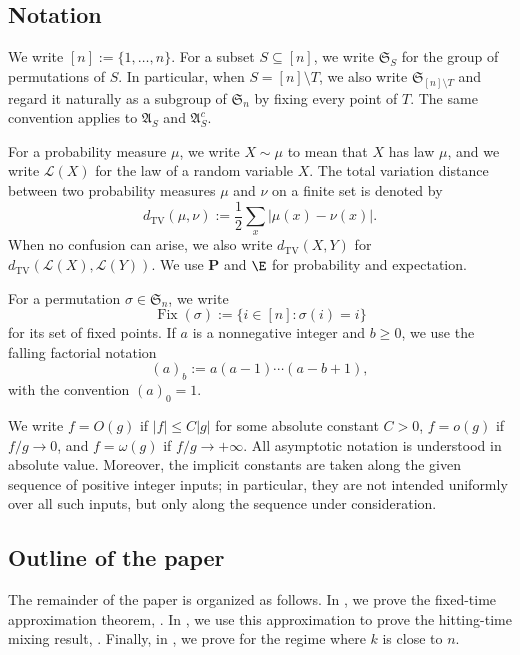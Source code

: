 
\subsection{Notation}

We write \([n]:=\{1,\ldots,n\}\). For a subset \(S\subseteq[n]\), we write \(\mathfrak S_S\) for the group of permutations of \(S\). In particular, when \(S=[n]\setminus T\), we also write \(\mathfrak S_{[n]\setminus T}\) and regard it naturally as a subgroup of \(\mathfrak S_n\) by fixing every point of \(T\). The same convention applies to \(\mathfrak A_S\) and \(\mathfrak A_S^c\).

For a probability measure \(\mu\), we write \(X\sim\mu\) to mean that \(X\) has law \(\mu\), and we write \(\mathcal L(X)\) for the law of a random variable \(X\). The total variation distance between two probability measures \(\mu\) and \(\nu\) on a finite set is denoted by
$$
d_{\mathrm{TV}}(\mu,\nu)
:=
\frac12\sum_x |\mu(x)-\nu(x)|.
$$
When no confusion can arise, we also write \(d_{\mathrm{TV}}(X,Y)\) for \(d_{\mathrm{TV}}(\mathcal L(X),\mathcal L(Y))\). We use \(\mathbf P\) and $\E$ for probability and expectation.

For a permutation \(\sigma\in\mathfrak S_n\), we write
$$
\operatorname{Fix}(\sigma):=\{i\in[n]:\sigma(i)=i\}
$$
for its set of fixed points. If \(a\) is a nonnegative integer and \(b\geq 0\), we use the falling factorial notation
$$
(a)_b:=a(a-1)\cdots(a-b+1),
$$
with the convention \((a)_0=1\).

We write \(f=O(g)\) if \(|f|\le C|g|\) for some absolute constant \(C>0\), \(f=o(g)\) if \(f/g\to0\), and \(f=\omega(g)\) if \(f/g\to+\infty\). All asymptotic notation is understood in absolute value. Moreover, the implicit constants are taken along the given sequence of positive integer inputs; in particular, they are not intended uniformly over all such inputs, but only along the sequence under consideration.

\subsection{Outline of the paper} 

The remainder of the paper is organized as follows. In , we prove the fixed-time approximation theorem, . In , we use this approximation to prove the hitting-time mixing result, . Finally, in , we prove  for the regime where \(k\) is close to \(n\).

